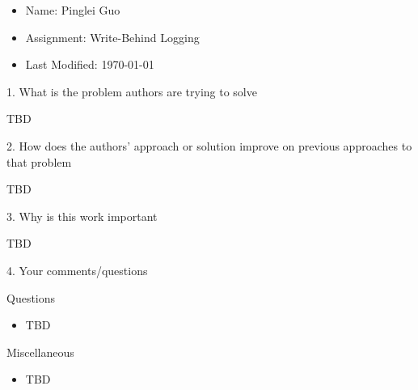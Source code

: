 \documentclass[12pt,a4paper,oneside]{article}
\begin{document}
\begin{itemize}
  \item Name: Pinglei Guo
  \item Assignment: Write-Behind Logging
  \item Last Modified: \today
\end{itemize}

1. What is the problem authors are trying to solve

\medskip

TBD

\bigskip

2. How does the authors’ approach or solution improve on previous approaches to that problem

\medskip

TBD

\bigskip

3. Why is this work important

\medskip

TBD

\bigskip

4. Your comments/questions

\medskip

Questions

\begin{itemize}
  \item TBD
\end{itemize}

Miscellaneous

\begin{itemize}
  \item TBD
\end{itemize}
\end{document}
